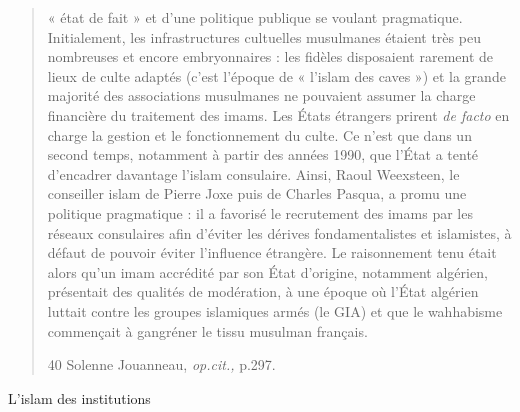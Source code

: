 \begin{quote}
« état de fait » et d'une politique publique se voulant pragmatique.
Initialement, les infrastructures cultuelles musulmanes étaient très peu
nombreuses et encore embryonnaires : les fidèles disposaient rarement de
lieux de culte adaptés (c'est l'époque de « l'islam des caves ») et la
grande majorité des associations musulmanes ne pouvaient assumer la
charge financière du traitement des imams. Les États étrangers prirent
\emph{de facto} en charge la gestion et le fonctionnement du culte. Ce
n'est que dans un second temps, notamment à partir des années 1990, que
l'État a tenté d'encadrer davantage l'islam consulaire. Ainsi, Raoul
Weexsteen, le conseiller islam de Pierre Joxe puis de Charles Pasqua, a
promu une politique pragmatique : il a favorisé le recrutement des imams
par les réseaux consulaires afin d'éviter les dérives fondamentalistes
et islamistes, à défaut de pouvoir éviter l'influence étrangère. Le
raisonnement tenu était alors qu'un imam accrédité par son État
d'origine, notamment algérien, présentait des qualités de modération, à
une époque où l'État algérien luttait contre les groupes islamiques
armés (le GIA) et que le wahhabisme commençait à gangréner le tissu
musulman français.

40 Solenne Jouanneau, \emph{op.cit.,} p.297.


\end{quote}

L'islam des institutions

